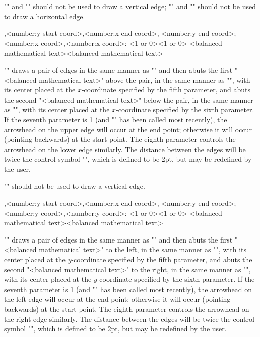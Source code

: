 \documentclass[11pt]{article}
\begin{document}
"\ctetg" and "\ctebg" should not be used to draw a vertical edge; "\ctelg" and
"\cterg" should not be used to draw a horizontal edge.
\begin{myverb}
    ,<number:y-start-coord>,<number:x-end-coord>,
        <number:y-end-coord>;<number:x-coord>,<number:x-coord>:
        {<1 or 0>}{<1 or 0>}
        {<balanced mathematical text>}{<balanced mathematical text>}
\end{myverb}
"\ctetbg" draws a pair of edges in the same manner as "\cten" and then abuts
the first "<balanced mathematical text>" above the pair, in the same manner
as "\ctetg", with its center placed at the $x$-coordinate specified by the
fifth parameter, and abuts the second "<balanced mathematical text>" below
the pair, in the same manner as "\ctebg", with its center placed at the
$x$-coordinate specified by the sixth parameter.  If the seventh parameter
is 1 (and "\cthead" has been called most recently), the arrowhead on the upper
edge will occur at the end point; otherwise it will occur (pointing
backwards) at the start point.  The eighth parameter controls the arrowhead
on the lower edge similarly.  The distance between the edges will be twice
the control symbol "\ctdoubleedgedisp", which is defined to be 2pt, but may
be redefined by the user.

"\ctetbg" should not be used to draw a vertical edge.
\begin{myverb}
    ,<number:y-start-coord>,<number:x-end-coord>,
        <number:y-end-coord>;<number:y-coord>,<number:y-coord>:
        {<1 or 0>}{<1 or 0>}
        {<balanced mathematical text>}{<balanced mathematical text>}
\end{myverb}
"\ctelrg" draws a pair of edges in the same manner as "\cten" and then abuts
the first "<balanced mathematical text>" to the left, in the same manner
as "\ctetg", with its center placed at the $y$-coordinate specified by the
fifth parameter, and abuts the second "<balanced mathematical text>" to
the right, in the same manner as "\ctebg", with its center placed at the
$y$-coordinate specified by the sixth parameter.  If the seventh parameter
is 1 (and "\cthead" has been called most recently), the arrowhead on the left
edge will occur at the end point; otherwise it will occur (pointing
backwards) at the start point.  The eighth parameter controls the arrowhead
on the right edge similarly.  The distance between the edges will be twice
the control symbol "\ctdoubleedgedisp", which is defined to be 2pt, but may
be redefined by the user.
\end{document}
